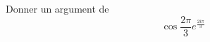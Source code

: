 Donner un argument de 
\begin{displaymath}
 \cos \frac{2\pi}{3}e^{\frac{2i\pi}{3}}
\end{displaymath}
\bigskip \bigskip
